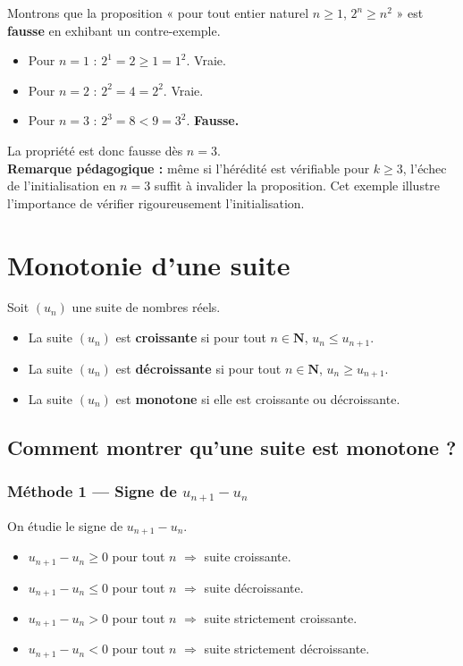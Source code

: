 \documentclass[11pt,a4paper,openany]{book}
\theoremstyle{definition}
\begin{document}
    \begin{Exemple}
    Montrons que la proposition « pour tout entier naturel $n \geq 1$, $2^n \geq n^2$ »
    est \textbf{fausse} en exhibant un contre-exemple.
    \begin{itemize}
        \item Pour $n = 1$ : $2^1 = 2 \geq 1 = 1^2$. \quad Vraie.
        \item Pour $n = 2$ : $2^2 = 4 = 2^2$. \quad Vraie.
        \item Pour $n = 3$ : $2^3 = 8 < 9 = 3^2$. \quad \textbf{Fausse.}
    \end{itemize}
    La propriété est donc fausse dès $n=3$.\\
    \textbf{Remarque pédagogique :} même si l'hérédité est vérifiable pour $k\geq 3$,
    l'échec de l'initialisation en $n=3$ suffit à invalider la proposition.
    Cet exemple illustre l'importance de vérifier rigoureusement l'initialisation.
    \end{Exemple}

    \section{Monotonie d'une suite}
    \begin{Définition}
        Soit $(u_n)$ une suite de nombres réels.
        \begin{itemize}
            \item La suite $(u_n)$ est \textbf{croissante} si pour tout $n\in\mathbf{N}$,
                  $u_n\leq u_{n+1}$.
            \item La suite $(u_n)$ est \textbf{décroissante} si pour tout $n\in\mathbf{N}$,
                  $u_n\geq u_{n+1}$.
            \item La suite $(u_n)$ est \textbf{monotone} si elle est croissante ou décroissante.
        \end{itemize}
    \end{Définition}

    \subsection{Comment montrer qu'une suite est monotone ?}

    \subsubsection{Méthode 1 — Signe de $u_{n+1}-u_n$}
    On étudie le signe de $u_{n+1}-u_n$.
    \begin{itemize}
        \item $u_{n+1}-u_n \geq 0$ pour tout $n$ $\Rightarrow$ suite croissante.
        \item $u_{n+1}-u_n \leq 0$ pour tout $n$ $\Rightarrow$ suite décroissante.
        \item $u_{n+1}-u_n > 0$ pour tout $n$ $\Rightarrow$ suite strictement croissante.
        \item $u_{n+1}-u_n < 0$ pour tout $n$ $\Rightarrow$ suite strictement décroissante.
    \end{itemize}
\end{document}
